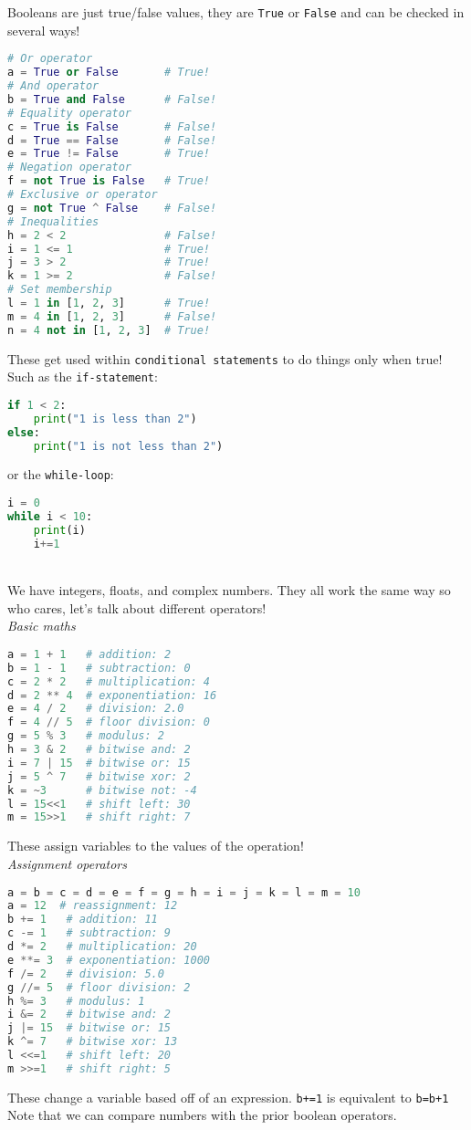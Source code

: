 \documentclass[12pt]{article}
\begin{document}
Booleans are just true/false values, they are \texttt{True} or \texttt{False} and can be checked in several ways!\\
\begin{lstlisting}[language=Python]
# Or operator
a = True or False       # True!
# And operator
b = True and False      # False!
# Equality operator
c = True is False       # False!
d = True == False       # False!
e = True != False       # True!
# Negation operator
f = not True is False   # True!
# Exclusive or operator
g = not True ^ False    # False! 
# Inequalities
h = 2 < 2               # False!
i = 1 <= 1              # True!
j = 3 > 2               # True!
k = 1 >= 2              # False!
# Set membership
l = 1 in [1, 2, 3]      # True!
m = 4 in [1, 2, 3]      # False!
n = 4 not in [1, 2, 3]  # True!
\end{lstlisting}
These get used within \texttt{conditional statements} to do things only when true! Such as the \texttt{if-statement}:\\
\begin{lstlisting}[language=Python]
if 1 < 2:
    print("1 is less than 2")
else:
    print("1 is not less than 2")
\end{lstlisting}
or the \texttt{while-loop}:\\
\begin{lstlisting}[language=Python]
i = 0
while i < 10:
    print(i)
    i+=1
\end{lstlisting}

\\

We have integers, floats, and complex numbers. They all work the same way so who cares, let's talk about different operators!\\
\textit{Basic maths}\\
\begin{lstlisting}[language=Python]
a = 1 + 1   # addition: 2
b = 1 - 1   # subtraction: 0
c = 2 * 2   # multiplication: 4
d = 2 ** 4  # exponentiation: 16
e = 4 / 2   # division: 2.0
f = 4 // 5  # floor division: 0
g = 5 % 3   # modulus: 2
h = 3 & 2   # bitwise and: 2
i = 7 | 15  # bitwise or: 15
j = 5 ^ 7   # bitwise xor: 2
k = ~3      # bitwise not: -4
l = 15<<1   # shift left: 30
m = 15>>1   # shift right: 7
\end{lstlisting}
These assign variables to the values of the operation!\\
\textit{Assignment operators}\\
\begin{lstlisting}[language=Python]
a = b = c = d = e = f = g = h = i = j = k = l = m = 10
a = 12  # reassignment: 12
b += 1   # addition: 11
c -= 1   # subtraction: 9
d *= 2   # multiplication: 20
e **= 3  # exponentiation: 1000
f /= 2   # division: 5.0
g //= 5  # floor division: 2
h %= 3   # modulus: 1
i &= 2   # bitwise and: 2
j |= 15  # bitwise or: 15
k ^= 7   # bitwise xor: 13
l <<=1   # shift left: 20
m >>=1   # shift right: 5
\end{lstlisting}
These change a variable based off of an expression. \texttt{b+=1} is equivalent to \texttt{b=b+1}\\
Note that we can compare numbers with the prior boolean operators.\\
\end{document}
